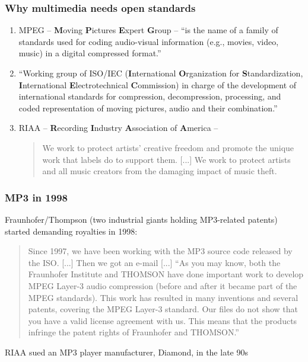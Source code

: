 \documentclass{beamer}
\begin{document}
\begin{frame}
	\frametitle{Why multimedia needs open standards}
	\begin{enumerate}
		\item
			MPEG -- \textbf{M}oving \textbf{P}ictures \textbf{E}xpert \textbf{G}roup -- ``is the name of a family of standards used for coding audio-visual information (e.g., movies, video, music) in a digital compressed format.''
		\item
			``Working group of ISO/IEC (\textbf{I}nternational \textbf{O}rganization for \textbf{S}tandardization, \textbf{I}nternational \textbf{E}lectrotechnical \textbf{C}ommission) in charge of the development of international standards for compression, decompression, processing, and coded representation of moving pictures, audio and their combination.''
		\item
			RIAA -- \textbf{R}ecording \textbf{I}ndustry \textbf{A}ssociation of \textbf{A}merica -- 
			\begin{quote}
				We work to protect artists' creative freedom and promote the unique work that labels do to support them. [...] We work to protect artists and all music creators from the damaging impact of music theft. 
			\end{quote}
	\end{enumerate}
\end{frame}

\begin{frame}
	\frametitle{MP3 in 1998}
	Fraunhofer/Thompson (two industrial giants holding MP3-related patents) started demanding royalties in 1998:
	\begin{quote}
		Since 1997, we have been working with the MP3 source code released by the ISO. [...] Then we got an e-mail [...] ``As you may know, both the Fraunhofer Institute and THOMSON have done important work to develop MPEG Layer-3 audio compression (before and after it became part of the MPEG standards). This work has resulted in many inventions and several patents, covering the MPEG Layer-3 standard. Our files do not show that you have a valid license agreement with us. This means that the products infringe the patent rights of Fraunhofer and THOMSON.''
	\end{quote}
	RIAA sued an MP3 player manufacturer, Diamond, in the late 90s
\end{frame}

\end{document}
